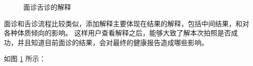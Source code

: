\begin{figure}
    \centering
    \caption{面诊舌诊的解释}
    \label{fig:face_diags}
\end{figure}

面诊和舌诊流程比较类似，添加解释主要体现在结果的解释，包括中间结果，和对各种体质倾向的影响。
这样用户查看解释之后，能够大致了解本次拍照是否成功，并且知道目前面诊的结果，会对最终的健康报告造成哪些影响。

如图 \ref{fig:face_diags} 所示：

